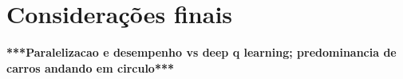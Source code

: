 \chapter{Considerações finais}

\textbf{***Paralelizacao e desempenho vs deep q learning; predominancia de carros andando em circulo***}

\lipsum[31-33]
